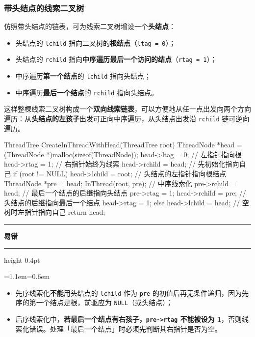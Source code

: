 \documentclass[11pt,openany,UTF8]{ctexbook}
\newcommand{\callouthead}[2]{%
  \par\addvspace{7pt}\noindent
  {\color{#1}\rule[-0.15em]{3pt}{1.05em}}\hspace{0.5em}%
  {\bfseries\color{#1}#2}\par\nobreak\vspace{-0.35em}%
  {\color{rulesep}\hrule height 0.4pt}\nobreak\vspace{0.45em}%
  \begingroup\small\setlength{\parindent}{0pt}%
  \leftskip=1.1em\rightskip=0.6em\noindent\ignorespaces}
\newcommand{\calloutend}{\par\endgroup\addvspace{7pt}}
\newenvironment{callwarn}[1]{\callouthead{warnbar}{#1}}{\calloutend}
\begin{document}
\subsubsection{带头结点的线索二叉树}

仿照带头结点的链表，可为线索二叉树增设一个\textbf{头结点}：

\begin{itemize}
\item 头结点的 \texttt{lchild} 指向二叉树的\textbf{根结点}（\texttt{ltag =\allowbreak{} 0}）；
\item 头结点的 \texttt{rchild} 指向\textbf{中序遍历最后一个访问的结点}（\texttt{rtag =\allowbreak{} 1}）；
\item 中序遍历\textbf{第一个结点}的 \texttt{lchild} 指向头结点；
\item 中序遍历\textbf{最后一个结点}的 \texttt{rchild} 指向头结点。
\end{itemize}
这样整棵线索二叉树构成一个\textbf{双向线索链表}，可以方便地从任一点出发向两个方向遍历：从\textbf{头结点的左孩子}出发可正向中序遍历，从头结点出发沿 \texttt{rchild} 链可逆向遍历。

\begin{codebox}
ThreadTree CreateInThreadWithHead(ThreadTree root) {
    ThreadNode *head = (ThreadNode *)malloc(sizeof(ThreadNode));
    head->ltag = 0;                  // 左指针指向根
    head->rtag = 1;                  // 右指针始终为线索
    head->rchild = head;             // 先初始化指向自己
    if (root != NULL) {
        head->lchild = root;         // 头结点的左指针指向根结点
        ThreadNode *pre = head;
        InThread(root, pre);         // 中序线索化
        pre->rchild = head;          // 最后一个结点的后继指向头结点
        pre->rtag = 1;
        head->rchild = pre;          // 头结点的后继指向最后一个结点
        head->rtag = 1;
    } else {
        head->lchild = head;         // 空树时左指针指向自己
    }
    return head;
}
\end{codebox}

\begin{callwarn}{易错}
\begin{itemize}
\item 先序线索化\textbf{不能}用头结点的 \texttt{lchild} 作为 \texttt{pre} 的初值后再无条件递归，因为先序的第一个结点是根，前驱应为 \texttt{NULL}（或头结点）；
\item 后序线索化中，\textbf{若最后一个结点有右孩子，\texttt{pre->\allowbreak{}rtag} 不能被设为 1}，否则线索化错误。处理「最后一个结点」时必须先判断其右指针是否为空。
\end{itemize}
\end{callwarn}
\end{document}
